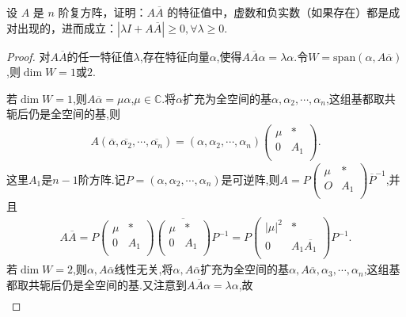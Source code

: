 \documentclass[../../main.tex]{subfiles}%
\begin{document}
\begin{example}
设 $A$ 是 $n$ 阶复方阵，证明：$A\overline{A}$ 的特征值中，虚数和负实数（如果存在）都是成对出现的，进而成立：$|\lambda I + A\overline{A}| \geqslant  0, \forall \lambda \geqslant  0$.
\end{example}
\begin{proof}
对$A\overline{A}$的任一特征值$\lambda$,存在特征向量$\alpha$,使得$A\overline{A}\alpha =\lambda \alpha$.令$W=\mathrm{span}\left( \alpha ,A\overline{\alpha } \right)$,则$\dim W=1$或$2$.

若$\dim W=1$,则$A\overline{\alpha }=\mu \alpha$,$\mu \in \mathbb{C}$.将$\alpha$扩充为全空间的基$\alpha ,\alpha _2,\cdots ,\alpha _n$,这组基都取共轭后仍是全空间的基,则
\begin{align*}
A\left( \overline{\alpha },\overline{\alpha _2},\cdots ,\overline{\alpha _n} \right) =\left( \alpha ,\alpha _2,\cdots ,\alpha _n \right) \begin{pmatrix}
\mu&		*\\
0&		A_1\\
\end{pmatrix}.
\end{align*}
这里$A_1$是$n-1$阶方阵.记$P=\left( \alpha ,\alpha _2,\cdots ,\alpha _n \right)$是可逆阵,则$A=P\begin{pmatrix}
\mu&		*\\
O&		A_1\\
\end{pmatrix} \overline{P}^{-1}$,并且
\begin{align*}
A\overline{A}=P\begin{pmatrix}
\mu&		*\\
0&		A_1\\
\end{pmatrix} \overline{\begin{pmatrix}
\mu&		*\\
0&		A_1\\
\end{pmatrix} }P^{-1}=P\begin{pmatrix}
\left| \mu \right|^2&		*\\
0&		A_1\overline{A_1}\\
\end{pmatrix} P^{-1}.
\end{align*}
若$\dim W=2$,则$\alpha ,A\overline{\alpha }$线性无关,将$\alpha ,A\overline{\alpha }$扩充为全空间的基$\alpha ,A\overline{\alpha },\alpha _3,\cdots ,\alpha _n$,这组基都取共轭后仍是全空间的基.又注意到$A\overline{A}\alpha =\lambda \alpha$,故
\begin{align*}

\end{align*}
\end{proof}
\end{document}
